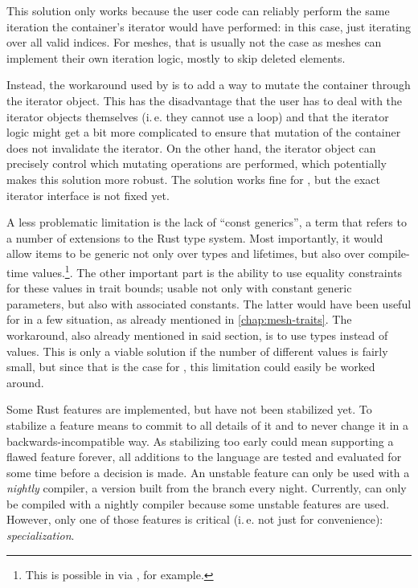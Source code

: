 This solution only works because the user code can reliably perform the same iteration the container's iterator would have performed: in this case, just iterating over all valid indices.
For meshes, that is usually not the case as meshes can implement their own iteration logic, mostly to skip deleted elements.

Instead, the workaround used by  is to add a way to mutate the container through the iterator object.
This has the disadvantage that the user has to deal with the iterator objects themselves (i.\,e. they cannot use a  loop) and that the iterator logic might get a bit more complicated to ensure that mutation of the container does not invalidate the iterator.
On the other hand, the iterator object can precisely control which mutating operations are performed, which potentially makes this solution more robust.
The solution works fine for , but the exact iterator interface is not fixed yet.

\newpage

A less problematic limitation is the lack of \enquote{const generics}, a term that refers to a number of extensions to the Rust type system.
Most importantly, it would allow items to be generic not only over types and lifetimes, but also over compile-time values.\footnote{This is possible in \cpp via , for example.}.
The other important part is the ability to use equality constraints for these values in trait bounds; usable not only with constant generic parameters, but also with associated constants.
The latter would have been useful for  in a few situation, as already mentioned in \autoref{chap:mesh-traits}.
The workaround, also already mentioned in said section, is to use types instead of values.
This is only a viable solution if the number of different values is fairly small, but since that is the case for , this limitation could easily be worked around.

Some Rust features are implemented, but have not been stabilized yet.
To stabilize a feature means to commit to all details of it and to never change it in a backwards-incompatible way.
As stabilizing too early could mean supporting a flawed feature forever, all additions to the language are tested and evaluated for some time before a decision is made.
An unstable feature can only be used with a \emph{nightly} compiler, a version built from the  branch every night.
Currently,  can only be compiled with a nightly compiler because some unstable features are used.
However, only one of those features is critical (i.\,e. not just for convenience): \emph{specialization}.

